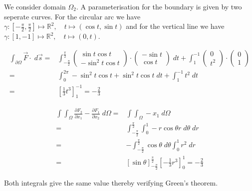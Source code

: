 \documentclass[11pt]{article}
\begin{document}
\begin{solution}
We consider domain $\Omega_2$. A parameterisation for the boundary is given by two seperate curves. For the circular arc we have $\gamma: [-\frac{\pi}{2},\frac{\pi}{2}] \mapsto \mathbb{R}^2, \quad t\mapsto  (\cos t, \sin t)$ and for the vertical line we have  $\gamma: [1,-1] \mapsto \mathbb{R}^2, \quad t\mapsto  (0, t)$. 

\begin{align*}
\int_{\partial \Omega} \vec{F} \cdot \;d\vec{s} =& \int_{-\frac{\pi}{2}}^ {\frac{\pi}{2}} \begin{pmatrix}\sin t \cos t\\ -\sin^2 t \cos t \end{pmatrix} \cdot \begin{pmatrix}-\sin t \\ \cos t \end{pmatrix} \; d t + \int_1^ {-1} \begin{pmatrix}0\\t^ 2\end{pmatrix}\cdot \begin{pmatrix}0\\1\end{pmatrix}\\
=& \int_0^{2\pi} -\sin^2 t\cos t + \sin^ 2 t \cos t \;dt + \int_{1}^ {-1} t^ 2 \;d t\\
=& \left[\frac{1}{3} t^ 3\right]_1^ {-1} = -\frac{2}{3}
\end{align*}

\begin{align*}
\int \int_{\Omega} \frac{\partial F_2}{\partial x_1} - \frac{\partial F_1}{\partial x_2} \;d \Omega =& \int \int_{\Omega} -x_1 \; d\Omega\\
=& \int_{-\frac{\pi}{2}}^ {\frac{\pi}{2}} \int_0^1 -r\cos \theta r \;d\theta\;dr\\
=& -\int_{-\frac{\pi}{2}}^ {\frac{\pi}{2}} \cos \theta \;d \theta \int_0^1 r^ 2 \;d r\\
=& \left[\sin \theta\right]_{-\frac{\pi}{2}}^ {\frac{\pi}{2}} \left[-\frac{1}{3}r^ 3\right]_0^{1} = -\frac{2}{3}
\end{align*}

Both integrals give the same value thereby verifying Green's theorem.\\

\end{solution}
\end{document}
